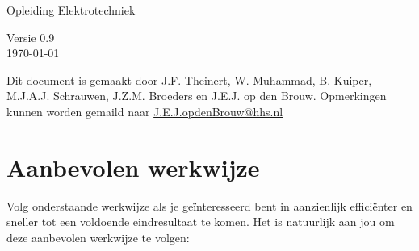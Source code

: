 \documentclass[a4paper,10pt,fleqn,twoside]{article}
\def\version{0.9}
\newif\ifprintdifficulty
\begin{document}
\begin{titlepage}
\vspace*{2cm}
\Large Opleiding Elektrotechniek\\

\vspace*{1cm}

\Large Versie \version\\ \today

\ifprintdifficulty
\vspace*{1cm}
\textcolor{red}{\fbox{Docentenexemplaar}}
\fi
\vfill
\end{titlepage}



\tableofcontents

\vfill
Dit document is gemaakt door J.F. Theinert, W. Muhammad, B. Kuiper, M.J.A.J. Schrauwen, J.Z.M. Broeders en J.E.J. op den Brouw.
Opmerkingen kunnen worden gemaild naar \href{mailto:J.E.J.opdenBrouw@hhs.nl}{J.E.J.opdenBrouw@hhs.nl}


\clearpage
\section*{Aanbevolen werkwijze}

Volg onderstaande werkwijze als je geïnteresseerd bent in aanzienlijk efficiënter en sneller tot een voldoende eindresultaat te komen. Het is natuurlijk aan jou om deze aanbevolen werkwijze te volgen:
\end{document}
